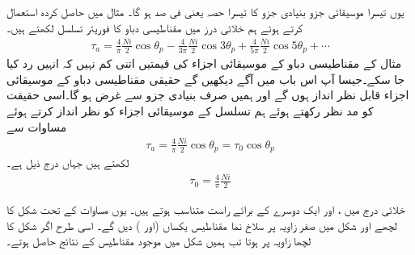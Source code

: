 یوں تیسرا موسیقائی جزو بنیادی جزو کا تیسرا حصہ یعنی  فی صد ہو گا۔
%
مثال  میں حاصل کردہ   استعمال کرتے ہوئے  ہم خلائی درز میں مقناطیسی دباو  کا فوریئر تسلسل لکھتے ہیں۔
\begin{align}\label{مساوات_تبادلہ_توانائی_فوریئر_متقناطیسی_دباو_تسلسل}
\tau_a=\frac{4}{\pi}\frac{Ni}{2} \cos \theta_p-\frac{4}{3\pi}\frac{Ni}{2} \cos 3\theta_p+\frac{4}{5\pi}\frac{Ni}{2} \cos 5\theta_p+\cdots
\end{align}
مثال  کے مقناطیسی دباو کے موسیقائی اجزاء  کی قیمتیں اتنی کم نہیں کہ انہیں رد کیا جا سکے۔جیسا آپ اس باب میں آگے دیکھیں گے حقیقی  مقناطیسی دباو کے موسیقائی اجزاء قابل نظر انداز ہوں گے اور ہمیں صرف بنیادی جزو  سے غرض ہو گا۔اسی حقیقت کو مد نظر رکھتے ہوئے ہم  تسلسل کے موسیقائی اجزاء کو نظر انداز کرتے ہوئے  مساوات  سے
\begin{align}\label{مساوات_گھومتے_مشین_پھیلا_سائن_نما}
\tau_{a}=\frac{4}{\pi}\frac{Ni}{2} \cos \theta_p=\tau_0 \cos \theta_p
\end{align}
لکھتے ہیں جہاں  درج ذیل ہے۔
\begin{align}\label{مساوات_گھومتے_مشین_دباو_چوٹی}
\tau_0=\frac{4}{\pi}\frac{Ni}{2} 
\end{align}

خلائی درج میں ،  اور  ایک دوسرے کے برائے راست متناسب ہوتے ہیں۔ یوں 
مساوات  کے تحت  شکل   کا لچھے اور  شکل   میں  صفر زاویہ پر سلاخ نما مقناطیس یکساں  (اور ) دیں گے۔ اسی طرح اگر شکل   کا لچھا  زاویہ   پر  ہوتا تب ہمیں  شکل   میں موجود مقناطیس کے نتائج حاصل ہوتے۔

